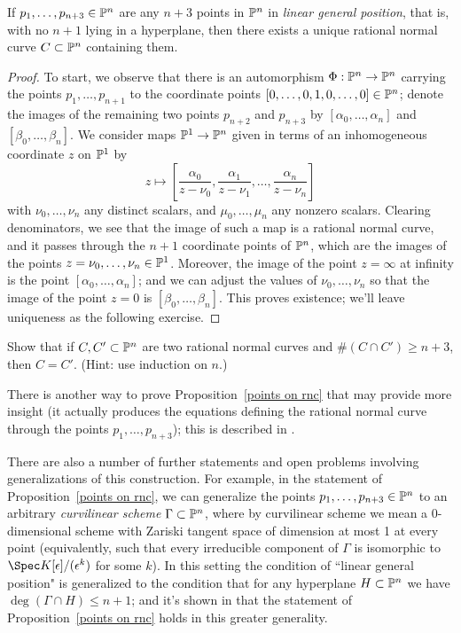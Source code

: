 \begin{proposition}\label{points on rnc}
If $p_1,\dots, p_{n+3} \in \PP^n$ are any $n+3$ points in $\PP^n$ in \emph{linear general position}, that is, with no $n+1$ lying in a hyperplane, then there exists a unique rational normal curve $C \subset \PP^n$ containing them.
 \end{proposition}

\begin{proof}
To start, we observe that there is an automorphism $\Phi : \PP^n \to \PP^n$ carrying the points $p_1,\dots,p_{n+1}$ to the coordinate points $[0,\dots,0,1,0,\dots,0] \in \PP^n$; denote the images of the remaining two points $p_{n+2}$ and $p_{n+3}$ by $[\alpha_0,\dots,\alpha_n]$ and $[\beta_0,\dots,\beta_n]$. We consider maps $\PP^1 \to \PP^n$ given in terms of an inhomogeneous coordinate $z$ on $\PP^1$ by
$$
z \mapsto \left[ \frac{\alpha_0}{z - \nu_0}, \frac{\alpha_1}{z - \nu_1} , \dots, \frac{\alpha_n}{z - \nu_n}  \right]
$$
with $\nu_0,\dots,\nu_n$ any distinct scalars, and $\mu_0,\dots,\mu_n$ any nonzero  scalars. Clearing denominators, we see that the image of such a map is a rational normal curve, and it passes through the $n+1$ coordinate points of $\PP^n$, which are the images of the points $z = \nu_0, \dots, \nu_n \in \PP^1$. Moreover, the image of the point $z = \infty$ at infinity is the point $[\alpha_0,\dots,\alpha_n]$; and we can adjust the values of $\nu_0,\dots,\nu_n$ so that the image of the point $z = 0$ is $[\beta_0,\dots,\beta_n]$. This proves existence; we'll leave uniqueness as the following exercise. 
\end{proof}

\begin{exercise}
Show that if $C, C' \subset \PP^n$ are two rational normal curves and $\#(C \cap C') \geq n+3$, then $C = C'$. (Hint: use induction on $n$.)
\end{exercise}

There is another way to prove Proposition~\ref{points on rnc} that may provide more insight (it actually produces the equations defining the rational normal curve through the points $p_1,\dots,p_{n+3}$); this is described in \cite{Montreal}. 

There are also a number of further statements and open problems involving generalizations of this construction. For example, in the statement of Proposition~\ref{points on rnc}, we can generalize the points $p_1,\dots, p_{n+3} \in \PP^n$ to an arbitrary \emph{curvilinear scheme} $\Gamma \subset \PP^n$, where by curvilinear scheme we mean a 0-dimensional scheme with Zariski tangent space of dimension at most 1 at every point (equivalently, such that every irreducible component of $\Gamma$ is isomorphic to $\Spec K[\epsilon]/(\epsilon^k)$ for some $k$). In this setting the condition of ``linear general position" is generalized to the condition that for any hyperplane $H \subset \PP^n$ we have $\deg(\Gamma \cap H) \leq n+1$; and it's shown in \cite{Eisenbud-Harris} that the statement of Proposition~\ref{points on rnc} holds in this greater generality.

